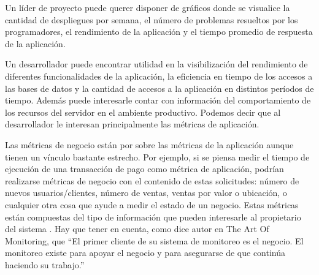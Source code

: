 Un líder de proyecto puede querer disponer de gráficos donde se visualice la
cantidad de despliegues por semana, el número de problemas resueltos por los
programadores, el rendimiento de la aplicación y el tiempo promedio de
respuesta de la aplicación.

Un desarrollador puede encontrar utilidad en la visibilización del rendimiento
de diferentes funcionalidades de la aplicación, la eficiencia en tiempo de los
accesos a las bases de datos y la cantidad de accesos a la aplicación en
distintos períodos de tiempo. Además puede interesarle contar con información
del comportamiento de los recursos del servidor en el ambiente productivo.
Podemos decir que al desarrollador le interesan principalmente las métricas de
aplicación.

Las métricas de negocio están por sobre las métricas de la aplicación aunque
tienen un vínculo bastante estrecho. Por ejemplo, si se piensa medir el tiempo
de ejecución de una transacción de pago como métrica de aplicación, podrían
realizarse métricas de negocio con el contenido de estas solicitudes: número de
nuevos usuarios/clientes, número de ventas, ventas por valor o ubicación, o
cualquier otra cosa que ayude a medir el estado de un negocio. Estas métricas
están compuestas del tipo de información que pueden interesarle al propietario
del sistema \cite[p.~446]{monitoreo:art_of_monitoring}. Hay que tener en
cuenta, como dice autor en The Art Of Monitoring, que “El primer cliente de su
sistema de monitoreo es el negocio. El monitoreo existe para apoyar el negocio
y para asegurarse de que continúa haciendo su trabajo.”
\cite[p.~8]{monitoreo:art_of_monitoring}

